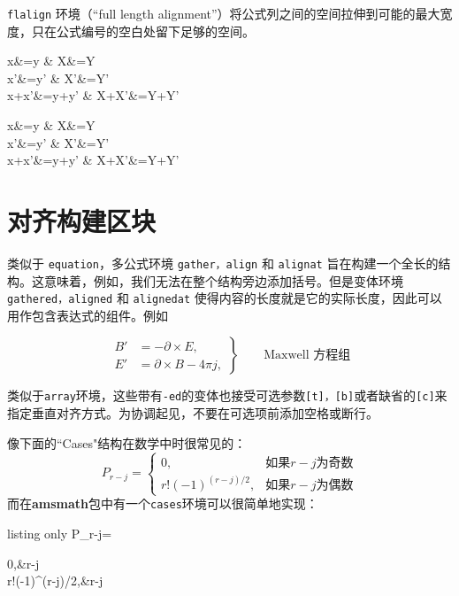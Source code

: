 \documentclass[openany]{ctexbook}
\begin{document}
\verb|flalign| 环境（“full length alignment”）将公式列之间的空间拉伸到可能的最大宽度，只在公式编号的空白处留下足够的空间。
\begin{tcblisting}{}
\begin{flalign}
x&=y                & X&=Y\\
x'&=y'              & X'&=Y'\\
x+x'&=y+y'          & X+X'&=Y+Y'
\end{flalign}
\end{tcblisting}

\begin{tcblisting}{}
  \begin{flalign*}
x&=y                & X&=Y\\
x'&=y'              & X'&=Y'\\
x+x'&=y+y'          & X+X'&=Y+Y'
\end{flalign*}
\end{tcblisting}

\section{对齐构建区块}
类似于 \verb|equation|，多公式环境 \verb|gather，align| 和 \verb|alignat| 旨在构建一个全长的结构。这意味着，例如，我们无法在整个结构旁边添加括号。但是变体环境 \verb|gathered，aligned| 和 \verb|alignedat| 使得内容的长度就是它的实际长度，因此可以用作包含表达式的组件。例如
\begin{tcblisting}{}
\begin{equation*}
\left.\begin{aligned}
B'&=-\partial\times E,\\
E'&=\partial\times B-4\pi j,
\end{aligned}
\right\}
\qquad \text{Maxwell 方程组}
\end{equation*}
\end{tcblisting}

类似于\verb|array|环境，这些带有\verb|-ed|的变体也接受可选参数\verb|[t]，[b]|或者缺省的\verb|[c]|来指定垂直对齐方式。为协调起见，不要在可选项前添加空格或断行。

像下面的``Cases"结构在数学中时很常见的：
\begin{equation}
P_{r-j}=\begin{cases}
0,&\text{如果}r-j\text{为奇数}\\
r!(-1)^{(r-j)/2},&\text{如果}r-j\text{为偶数}
\end{cases}
\end{equation}
而在{\bfseries amsmath}包中有一个\verb|cases|环境可以很简单地实现：
\begin{tcblisting}{listing only}
P_{r-j}=\begin{cases}
0,&r-j\\
r!(-1)^{(r-j)/2},&r-j
\end{cases}
\end{tcblisting}
\end{document}
